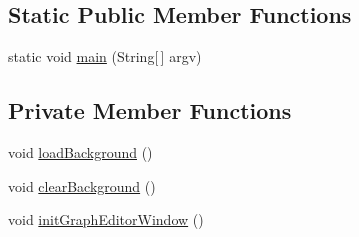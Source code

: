 \subsection*{Static Public Member Functions}
\begin{DoxyCompactItemize}
\item 
static void \mbox{\hyperlink{classorg_1_1newdawn_1_1slick_1_1tools_1_1peditor_1_1_particle_editor_a51a63bbfa358bed2b30d9f9c37e61ee4}{main}} (String\mbox{[}$\,$\mbox{]} argv)
\end{DoxyCompactItemize}
\subsection*{Private Member Functions}
\begin{DoxyCompactItemize}
\item 
void \mbox{\hyperlink{classorg_1_1newdawn_1_1slick_1_1tools_1_1peditor_1_1_particle_editor_a86caaac4d2b079e90e4129a45bd107a6}{load\+Background}} ()
\item 
void \mbox{\hyperlink{classorg_1_1newdawn_1_1slick_1_1tools_1_1peditor_1_1_particle_editor_ab729bcb367d846ce0ce1e9071b491cea}{clear\+Background}} ()
\item 
void \mbox{\hyperlink{classorg_1_1newdawn_1_1slick_1_1tools_1_1peditor_1_1_particle_editor_a097c7e7831411e3c05dba0688e7cbeba}{init\+Graph\+Editor\+Window}} ()
\end{DoxyCompactItemize}
